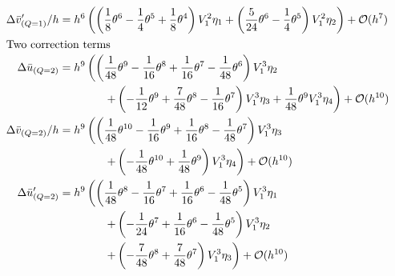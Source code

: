 \begin{align*}
    \Delta \bar{v}'_{(Q=1)}/h & = h^{6}\left(\left(\frac{1}{8} \theta^{6} - \frac{1}{4} \theta^{5} + \frac{1}{8} \theta^{4}\right) V_{1}^{2} \eta_{1} + \left(\frac{5}{24} \theta^{6} - \frac{1}{4} \theta^{5}\right) V_{1}^{2} \eta_{2}\right) + \mathcal{O}(h^{7})     \\
    \intertext{Two correction terms}
    \Delta \bar{u}_{(Q=2)}    & = h^{9}\left(\left(\frac{1}{48} \theta^{9} - \frac{1}{16} \theta^{8} + \frac{1}{16} \theta^{7} - \frac{1}{48} \theta^{6}\right) V_{1}^{3} \eta_{2} \right.                                                                               \\
                              & \qquad\qquad \left.
    + \left(-\frac{1}{12} \theta^{9} + \frac{7}{48} \theta^{8} - \frac{1}{16} \theta^{7}\right) V_{1}^{3} \eta_{3} 											%
    +\frac{1}{48} \theta^{9} V_{1}^{3} \eta_{4}\right) + \mathcal{O}(h^{10})                                                                                                                                                                                             \\
    \Delta \bar{v}_{(Q=2)}/h  & = h^{9}\left(\left(\frac{1}{48} \theta^{10} - \frac{1}{16} \theta^{9} + \frac{1}{16} \theta^{8} - \frac{1}{48} \theta^{7}\right) V_{1}^{3} \eta_{3} \right.                                                                              \\
                              & \qquad\qquad \left. + \left(-\frac{1}{48} \theta^{10} + \frac{1}{48} \theta^{9}\right) V_{1}^{3} \eta_{4}\right) + \mathcal{O}(h^{10})                                                                                                   \\
    \Delta \bar{u}'_{(Q=2)}   & = h^{9}\left(\left(\frac{1}{48} \theta^{8} - \frac{1}{16} \theta^{7} + \frac{1}{16} \theta^{6} - \frac{1}{48} \theta^{5}\right) V_{1}^{3} \eta_{1} \right.                                                                               \\
                              & \qquad\qquad \left. + \left(-\frac{1}{24} \theta^{7} + \frac{1}{16} \theta^{6} - \frac{1}{48} \theta^{5}\right) V_{1}^{3} \eta_{2} \right.                                                                                               \\
                              & \qquad\qquad \left. + \left(-\frac{7}{48} \theta^{8} + \frac{7}{48} \theta^{7}\right) V_{1}^{3} \eta_{3}\right) + \mathcal{O}(h^{10})                                                                                                    \\

\end{align*}
